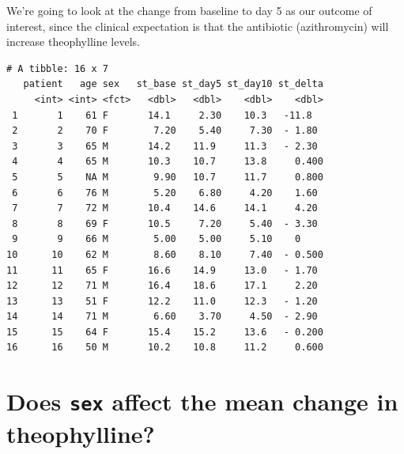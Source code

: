 \documentclass[]{book}
\newenvironment{Shaded}{\begin{snugshade}}{\end{snugshade}}
\newcommand{\KeywordTok}[1]{\textcolor[rgb]{0.13,0.29,0.53}{\textbf{#1}}}
\newcommand{\DataTypeTok}[1]{\textcolor[rgb]{0.13,0.29,0.53}{#1}}
\newcommand{\StringTok}[1]{\textcolor[rgb]{0.31,0.60,0.02}{#1}}
\newcommand{\OperatorTok}[1]{\textcolor[rgb]{0.81,0.36,0.00}{\textbf{#1}}}
\newcommand{\NormalTok}[1]{#1}
\theoremstyle{definition}
\theoremstyle{definition}
\theoremstyle{definition}
\theoremstyle{remark}
\begin{document}
We're going to look at the change from baseline to day 5 as our outcome
of interest, since the clinical expectation is that the antibiotic
(azithromycin) will increase theophylline levels.

\begin{Shaded}
\end{Shaded}

\begin{verbatim}
# A tibble: 16 x 7
   patient   age sex   st_base st_day5 st_day10 st_delta
     <int> <int> <fct>   <dbl>   <dbl>    <dbl>    <dbl>
 1       1    61 F       14.1     2.30    10.3   -11.8  
 2       2    70 F        7.20    5.40     7.30  - 1.80 
 3       3    65 M       14.2    11.9     11.3   - 2.30 
 4       4    65 M       10.3    10.7     13.8     0.400
 5       5    NA M        9.90   10.7     11.7     0.800
 6       6    76 M        5.20    6.80     4.20    1.60 
 7       7    72 M       10.4    14.6     14.1     4.20 
 8       8    69 F       10.5     7.20     5.40  - 3.30 
 9       9    66 M        5.00    5.00     5.10    0    
10      10    62 M        8.60    8.10     7.40  - 0.500
11      11    65 F       16.6    14.9     13.0   - 1.70 
12      12    71 M       16.4    18.6     17.1     2.20 
13      13    51 F       12.2    11.0     12.3   - 1.20 
14      14    71 M        6.60    3.70     4.50  - 2.90 
15      15    64 F       15.4    15.2     13.6   - 0.200
16      16    50 M       10.2    10.8     11.2     0.600
\end{verbatim}

\section{\texorpdfstring{Does \texttt{sex} affect the mean change in
theophylline?}{Does sex affect the mean change in theophylline?}}\label{does-sex-affect-the-mean-change-in-theophylline}

\begin{Shaded}
\end{Shaded}
\end{document}

